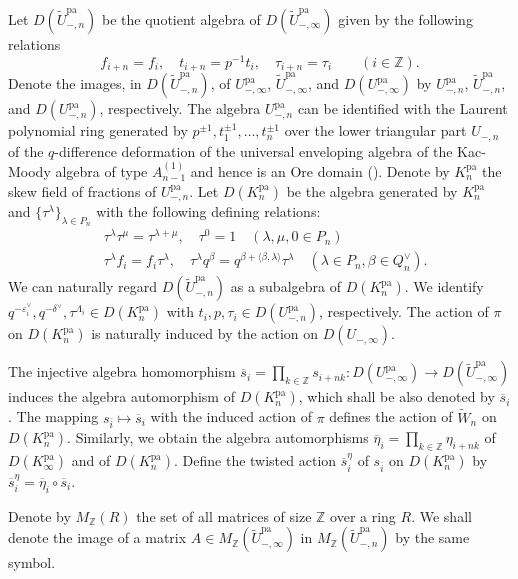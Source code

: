 \documentclass[12pt,twoside]{article}
\newcommand\tU{{\widetilde U}}
\newcommand\tW{{\widetilde W}}
\newcommand\bars{{\overline s}}
\newcommand\bareta{{\overline \eta}}
\newcommand\barhs{\bars^\eta}
\newcommand\eps{\varepsilon}
\newcommand\epsv{\eps^\vee}
\newcommand\deltav{\delta^\vee}
\newcommand\Qv{Q^\vee}
\newcommand\bra{\langle}
\newcommand\ket{\rangle}
\newcommand\pa{{\mathrm{pa}}}
\newcommand\Z{{\mathbb Z}} %
\theoremstyle{plain} %
\theoremstyle{definition} %
\theoremstyle{definition} %
\numberwithin{theorem}{section}
\numberwithin{equation}{section}
\numberwithin{figure}{section}
\numberwithin{table}{section}
\begin{document}
Let $D(\tU_{-,n}^\pa)$ be the quotient algebra of $D(\tU_{-,\infty}^\pa)$
given by the following relations
\begin{equation}
 f_{i+n} = f_i, \quad t_{i+n} = p^{-1}t_i, \quad \tau_{i+n}=\tau_i
 \qquad (i\in\Z).
 \label{eq:n-reduction}
\end{equation}
Denote the images, in $D(\tU_{-,n}^\pa)$, of 
$U_{-,\infty}^\pa$, $\tU_{-,\infty}^\pa$, and $D(U_{-,\infty}^\pa)$ 
by $U_{-,n}^\pa$, $\tU_{-,n}^\pa$, and $D(U_{-,n}^\pa)$,
respectively.
The algebra $U_{-,n}^\pa$ can be identified with 
the Laurent polynomial ring 
generated by $p^{\pm1},t_1^{\pm1},\ldots,t_n^{\pm1}$
over the lower triangular part $U_{-,n}$ of 
the $q$-difference deformation of the universal enveloping algebra 
of the Kac-Moody algebra of type $A^{(1)}_{n-1}$
and hence is an Ore domain (\cite{Kuroki2008}).
Denote by $K_n^\pa$ the skew field of fractions of $U_{-,n}^\pa$.
Let $D(K_n^\pa)$ be the algebra generated by $K_n^\pa$
and $\{\tau^\lambda\}_{\lambda\in P_n}$ 
with the following defining relations:
\begin{align*}
 &
 \tau^\lambda \tau^\mu = \tau^{\lambda+\mu}, \quad
 \tau^0 = 1
 \quad (\lambda,\mu,0\in P_n)
 \\ &
 \tau^\lambda f_i = f_i \tau^\lambda, \quad
 \tau^\lambda q^\beta = q^{\beta+\bra\beta,\lambda\ket}\tau^\lambda
 \quad (\lambda\in P_n, \beta\in\Qv_n).
\end{align*}
We can naturally regard $D(\tU_{-,n}^\pa)$
as a subalgebra of $D(K_n^\pa)$.
We identify $q^{-\epsv_i},q^{-\deltav},\tau^{\Lambda_i}\in D(K_n^\pa)$
with $t_i,p,\tau_i\in D(U_{-,n}^\pa)$, respectively.
The action of $\pi$ on $D(K_n^\pa)$ is naturally induced
by the action on $D(U_{-,\infty})$.

The injective algebra homomorphism 
$\bars_i=\prod_{k\in\Z}s_{i+nk}:D(U_{-,\infty}^\pa)\to D(\tU_{-,\infty}^\pa)$
induces the algebra automorphism of $D(K_n^\pa)$, 
which shall be also denoted by $\bars_i$.
The mapping $s_{\overline{i}}\mapsto\bars_i$ with the induced action of $\pi$
defines the action of $\tW_n$ on $D(K_n^\pa)$.
Similarly, we obtain the algebra automorphisms
$\bareta_i=\prod_{k\in\Z}\eta_{i+nk}$ of 
$D(K_\infty^\pa)$ and of $D(K_n^\pa)$.
Define the twisted action $\barhs_i$ of $s_{\overline{i}}$ on $D(K_n^\pa)$ 
by $\barhs_i = \bareta_i\circ\bars_i$.

Denote by $M_\Z(R)$ the set of all matrices of size $\Z$ over a ring $R$.
We shall denote the image of a matrix $A\in M_\Z(\tU_{-,\infty}^\pa)$
in $M_\Z(\tU_{-,n}^\pa)$ by the same symbol.
\end{document}
